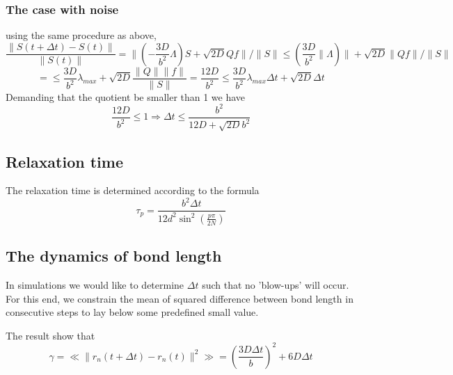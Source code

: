 \documentclass{paper}
\begin{document}
 \subsubsection{The case with noise}
 using the same procedure as above, 
 \begin{equation*}
\frac{\|S(t+\Delta t)-S(t)\|}{\|S(t)\|}=\|(-\frac{3D}{b^2}\Lambda)S+\sqrt{2D}Qf\|/\|S\|\leq(\frac{3D}{b^2}\|\Lambda)\| +\sqrt{2D}\|Qf\|/\|S\|
 \end{equation*}
 \begin{equation*}
 =\leq \frac{3D}{b^2}\lambda_{max} +\sqrt{2D}\frac{\|Q\|\|f\|}{\|S\|}=\frac{12D}{b^2}\leq\frac{3D}{b^2}\lambda_{max}\Delta t +\sqrt{2D}\Delta t
 \end{equation*}
Demanding that the quotient be smaller than 1 we have 
\begin{equation*}
 \frac{12D}{b^2}\leq1 \Longrightarrow \Delta t \leq \frac{b^2}{12D+\sqrt{2D}b^2}
 \end{equation*}
\subsection{Relaxation time}
The relaxation time is determined according to the formula
\begin{equation}
\tau_p = \frac{b^2\Delta t}{12d^2\sin^2(\frac{p\pi}{2N})}
\end{equation} 

\subsection{The dynamics of bond length}\label{subsection_theDynamicsOfBondLength}
In simulations we would like to determine $\Delta t$ such that no 'blow-ups' will occur. For this end, we constrain the mean of squared difference between bond length in consecutive steps to lay below some predefined small value. 

The result show that 
\begin{equation*}
\gamma=\ll\|r_n(t+\Delta t)-r_n(t) \|^2\gg = \left(\frac{3D\Delta t}{b} \right)^2+6D\Delta t
\end{equation*}


\end{document}

